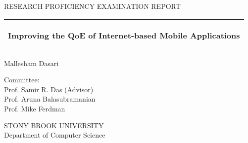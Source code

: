 %
%
%
%
%
\begin{titlepage}
  \addtolength{\hoffset}{0.5\evensidemargin-0.5\oddsidemargin} %
  \noindent%
\begin{center}
    {\Large
          RESEARCH PROFICIENCY EXAMINATION REPORT
         }\\
    \vspace{0.2cm}
     \end{center}
   \vspace{4 cm}
   \begin{tabular}{@{}p{\textwidth}@{}}
    \toprule[2pt]
    \midrule
    \vspace{0.2cm}
    \begin{center}
    \Huge{\textbf{
      Improving the QoE of Internet-based Mobile Applications %
    }}
    \end{center}
    
    \vspace{0.2cm}\\
    \midrule
    \toprule[2pt]
  \end{tabular}
  
  \vspace{2 cm}
  \begin{center}
    {\Large
      Mallesham Dasari 
    }\\
      \vspace{2 cm}

    
    {\Large
      Committee:
      }\\
Prof. Samir R. Das (Advisor)\\
Prof. Aruna Balasubramanian\\
Prof. Mike Ferdman\\
    \vspace{0.2cm}
    \end{center}
  \vspace{2 cm}

  \begin{center}
STONY BROOK UNIVERSITY\\
Department of Computer Science\\
  \end{center}
\end{titlepage}
\clearpage
